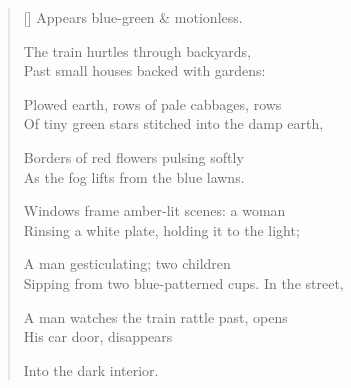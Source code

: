 \label{ch:england}
\settowidth{\versewidth}{Sipping from two blue-patterned cups.     In the street,}
\begin{verse}[\versewidth]
\hspace*{2\vgap} Appears blue-green \& motionless.

The train hurtles through backyards,\\
Past small houses backed with gardens:

Plowed earth, rows of pale cabbages, rows\\
Of tiny green stars stitched into the damp earth,

Borders of red flowers pulsing softly\\
As the fog lifts from the blue lawns.

Windows frame amber-lit scenes: a woman\\
Rinsing a white plate, holding it to the light;

A man gesticulating; two children\\
Sipping from two blue-patterned cups. In the street,

A man watches the train rattle past, opens\\
His car door, disappears

Into the dark interior.
\end{verse}
